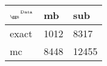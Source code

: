 \begin{tabular}{lll}
    \toprule
    $_{\text{\tiny{\ggn}}}$$^{\text{\tiny{Data}}}$ & mb & sub \\
    \midrule
    exact & 1012
              & 8317 \\
    mc   & 8448
              & 12455 \\
    \bottomrule
\end{tabular}